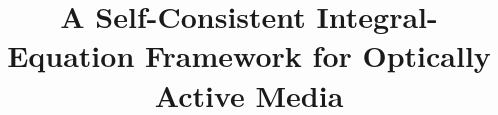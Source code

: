 \documentclass[conference]{IEEEtran}
\begin{document}
\title{A Self-Consistent Integral-Equation Framework for Optically Active Media}



\maketitle
\end{document}
